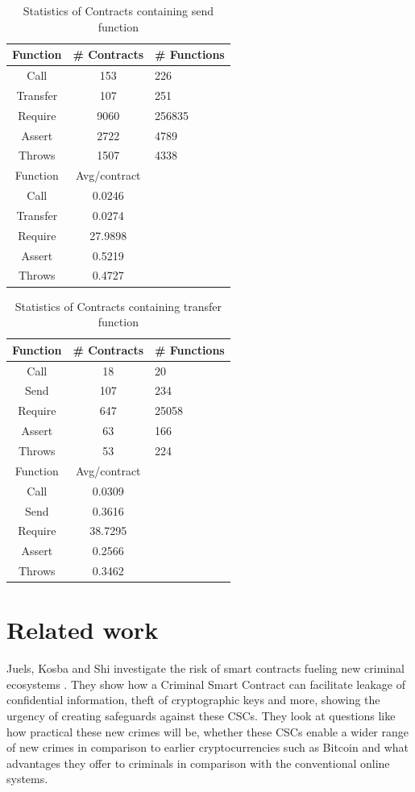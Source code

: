 \documentclass[10pt,conference]{IEEEtran}
\begin{document}
\begin{table}
  \caption{Statistics of Contracts containing send function}
  \label{tab:send}
  \begin{tabular}{ccl}
    \hline
    Function & \# Contracts & \# Functions\\
    \hline
    Call&153&226\\
    Transfer&107&251\\
    Require&9060&256835\\
    Assert&2722&4789\\
    Throws&1507&4338\\
    \hline
    Function & Avg/contract\\
    \hline
    Call&0.0246\\
    Transfer&0.0274\\
    Require&27.9898\\
    Assert&0.5219\\
    Throws&0.4727\\
  \hline
\end{tabular}
\end{table}

\begin{table}
  \caption{Statistics of Contracts containing transfer function}
  \label{tab:transfer}
  \begin{tabular}{ccl}
    \hline
    Function & \# Contracts & \# Functions\\
    \hline
    Call&18&20\\
    Send&107&234\\
    Require&647&25058\\
    Assert&63&166\\
    Throws&53&224\\
    \hline
    Function & Avg/contract\\
    \hline
    Call&0.0309\\
    Send&0.3616\\
    Require&38.7295\\
    Assert&0.2566\\
    Throws&0.3462\\
  \hline
\end{tabular}
\end{table}
\section{Related work}


Juels, Kosba and Shi\cite{criminal} investigate the risk of smart contracts fueling new criminal ecosystems . They show how a Criminal Smart Contract can facilitate leakage of confidential information, theft of cryptographic keys and more, showing the urgency of creating safeguards against these CSCs. They look at questions like how practical these new crimes will be, whether these CSCs enable a wider range of new crimes in comparison to earlier cryptocurrencies such as Bitcoin and what advantages they offer to criminals in comparison with the conventional online systems. 
\end{document}
